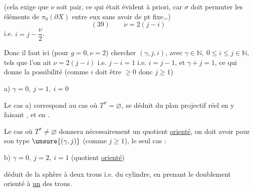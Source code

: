 
(cela exige que $\nu$ soit pair, ce qui était évident à priori, car $\sigma$ doit permuter les éléments de $\pi_0(\partial X)$ entre eux sans  avoir de pt fixe\ldots)
\[
(39)\qquad \nu=2(j-i)
\]
i.e. \uline{$i=j-\dfrac{\nu}{2}$}.

Donc il faut ici (pour $g=0,\nu=2$) chercher $(\gamma,j,i)$, avec $\gamma\in\mathbb N,\ 0\leq i\leq j\in\mathbb N$, tels que l'on ait $\nu=2(j-i)$ i.e. $j-i=1$ i.e. $i=j-1$, et $\gamma+j=1$, ce qui donne la  possibilité (comme $i$ doit être $\geq0$ donc $j\geq1$)

a) $\gamma=0,\ j=1,\ i=0$ 


Le cas a) correspond au cas où  $T^\sigma=\varnothing$,  se déduit du plan projectif réel en y faisant  ,  et en . 

Le cas où $T^\sigma\neq\varnothing$ donnera nécessairement un quotient  \uline{orienté}, on doit avoir pour son type $\unsure{(\gamma,j)}$ (comme $j\geq1$), le seul cas :

b) $\gamma=0,\ j=2,\ i=1$ (quotient \uline{orienté})

déduit de la sphère à deux trous i.e. du cylindre, en prenant le doublement orienté  à \uline{un} des trous. 

